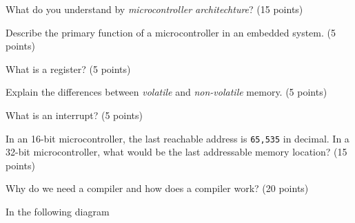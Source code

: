 \documentclass[11pt,letterpaper]{exam}
\begin{document}
    \begin{questions}
        \question What do you understand by \textit{microcontroller architechture}? (15 points)

        \question Describe the primary function of a microcontroller in an embedded system. (5 points)
    
        \question What is a register? (5 points)
    
        
        \question Explain the differences between \textit{volatile} and \textit{non-volatile} memory. (5 points)
        
        \question What is an interrupt?  (5 points) 

        \question In an 16-bit microcontroller, the last reachable address is \texttt{65,535} in decimal. In a 32-bit microcontroller, what would be the last addressable memory location? (15 points)
        
        \clearpage
        \question Why do we need a compiler and how does a compiler work? (20 points)

        \question In the following diagram 
        
    \end{questions}
\end{document}
